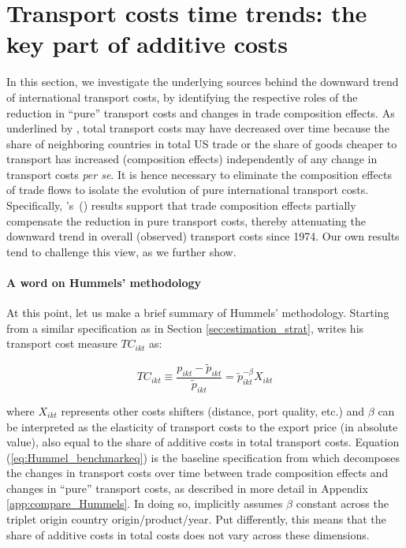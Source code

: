 \documentclass[a4paper,11pt]{article}
\newcommand\cites[1]{\citeauthor{#1}'s\ (\citeyear{#1})}
\begin{document}
\section{Transport costs time trends: the key part of additive costs}\label{sec:results_trends}

In this section, we investigate the underlying sources behind the downward trend of international transport costs, by identifying the respective roles of the reduction in ``pure'' transport costs and changes in trade composition effects. As underlined by \cite{hummels2007}, total transport costs may have decreased over time because the share of neighboring countries in total US trade or the share of goods cheaper to transport has increased (composition effects) independently of any change in transport costs \textit{per se}. It is hence necessary to eliminate the composition effects of trade flows to isolate the evolution of pure international transport costs. Specifically, \cites{hummels2007} results support that trade composition effects partially compensate the reduction in pure transport costs, thereby attenuating the downward trend in overall (observed) transport costs since 1974. Our own results tend to challenge this view, as we further show.

\paragraph{A word on Hummels' methodology} At this point, let us make a brief summary of Hummels' methodology\nocite{hummels2007}.
Starting from a similar specification as in Section \ref{sec:estimation_strat}, \cite{hummels2007} writes his transport cost measure $TC_{ikt}$ as:

\begin{equation}
TC_{ikt}\equiv \frac{p_{ikt}-\widetilde{p}_{ikt}}{\widetilde{p}_{ikt}} = \widetilde{p}_{ikt}^{-\beta}X_{ikt} \label{eq:Hummel_benchmarkeq}
\end{equation}

\noindent where $X_{ikt}$ represents other costs shifters (distance, port quality, etc.) and $\beta$ can be interpreted as the elasticity of transport costs to the export price (in absolute value), also equal to the share of additive costs in total transport costs.
Equation (\ref{eq:Hummel_benchmarkeq}) is the baseline specification from which \cite{hummels2007} decomposes the changes in transport costs over time between trade composition effects and changes in ``pure'' transport costs, as described in more detail in Appendix \ref{app:compare_Hummels}.
In doing so, \cite{hummels2007} implicitly assumes $\beta$ constant across the triplet origin country origin/product/year.
Put differently, this means that the share of additive costs in total costs does not vary across these dimensions.
\end{document}
